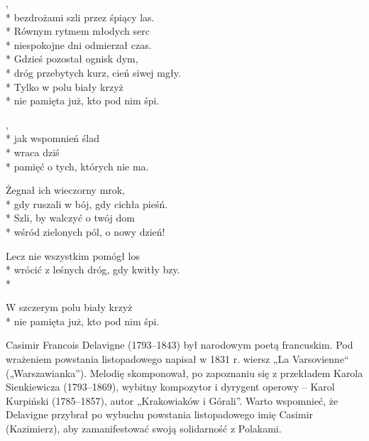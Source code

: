 
\begin{lyrics}[longestline={dróg przebytych kurz, cień siwej mgły.}]

,\\*
bezdrożami szli przez śpiący las.\\*
Równym rytmem młodych serc\\*
niespokojne dni odmierzał czas.\\*
\smallskip
Gdzieś pozostał ognisk dym,\\*
dróg przebytych kurz, cień siwej mgły.\\*
Tylko w polu biały krzyż\\*
nie pamięta już, kto pod nim śpi.

\begin{chorus}
,\\*
jak wspomnień ślad\\*
wraca dziś\\*
pamięć o tych, których nie ma.
\end{chorus}

Żegnał ich wieczorny mrok,\\*
gdy ruszali w bój, gdy cichła pieśń.\\*
Szli, by walczyć o twój dom\\*
wśród zielonych pól, o nowy dzień!

\chorusref

Lecz nie wszystkim pomógł los\\*
wrócić z leśnych dróg, gdy kwitły bzy.\\*
\begin{markverses}%
W szczerym polu biały krzyż\\*
nie pamięta już, kto pod nim śpi.
\end{markverses}
\end{lyrics}



\begin{info}Casimir Francois Delavigne (1793–1843) był narodowym poetą francuskim. Pod wrażeniem powstania listopadowego napisał w 1831 r. wiersz „La Varsovienne“ („Warszawianka”). Melodię skomponował, po zapoznaniu się z przekładem Karola Sienkiewicza (1793–1869), wybitny kompozytor i dyrygent operowy – Karol Kurpiński (1785–1857), autor „Krakowiaków i Górali”. Warto wspomnieć, że Delavigne przybrał po wybuchu powstania listopadowego imię Casimir (Kazimierz), aby zamanifestować swoją solidarność z Polakami.\end{info}

